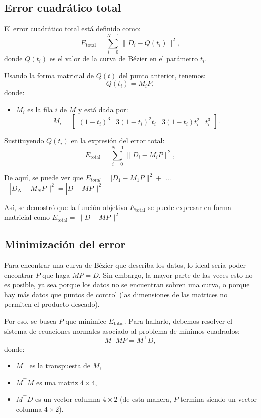 \documentclass{article}
\begin{document}
\subsection*{Error cuadrático total}

El error cuadrático total está definido como:
\[
E_{\text{total}} = \sum_{i=0}^{N-1} \|D_i - Q(t_i)\|^2,
\]
donde \( Q(t_i) \) es el valor de la curva de Bézier en el parámetro \( t_i \).

Usando la forma matricial de \( Q(t) \) del punto anterior, tenemos:
\[
Q(t_i) = M_i P,
\]
donde:
\begin{itemize}
    \item \( M_i \) es la fila \( i \) de $M$ y está dada por:
    \[
    M_i = \begin{bmatrix}
    (1 - t_i)^3 & 3(1 - t_i)^2 t_i & 3(1 - t_i) t_i^2 & t_i^3
    \end{bmatrix}.
    \]
\end{itemize}

Sustituyendo \( Q(t_i) \) en la expresión del error total:
\[
    E_{\text{total}} = \sum_{i=0}^{N-1} \|D_i - M_iP\|^2,
\]

De aquí, se puede ver que $E_{total} = |D_1 - M_1P\|^2 +$ ... $+ |D_N - M_NP\|^2 = |D - MP\|^2$ 

Así, se demostró que la función objetivo \( E_{\text{total}}\) se puede expresar en forma matricial como  \( E_{\text{total}} = \|D - MP\|^2 \)

\subsection*{Minimización del error}
Para encontrar una curva de Bézier que describa los datos, lo ideal sería poder encontrar $P$ que haga $MP = D$. Sin embargo, la mayor parte de las veces esto no es posible, ya sea porque los datos no se encuentran sobren una curva, o porque hay más datos que puntos de control (las dimensiones de las matrices no permiten el producto deseado).

Por eso, se busca $P$ que minimice \( E_{\text{total}} \). Para hallarlo, debemos resolver el sistema de ecuaciones normales asociado al problema de mínimos cuadrados:
\[
M^\top M P = M^\top D,
\]
donde:
\begin{itemize}
    \item \( M^\top \) es la transpuesta de \( M \),
    \item \( M^\top M \) es una matriz \( 4 \times 4 \),
    \item \( M^\top D \) es un vector columna \( 4 \times 2 \) (de esta manera, $P$ termina siendo un vector columna $4 \times 2$).
\end{itemize}
\end{document}
